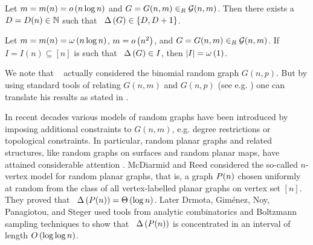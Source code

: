\begin{thm}\label{MDthm:max_degree_ergraph}
Let $m=m(n)=o\left(n\log n\right)$ and $G=G(n,m)\in_R \mathcal G(n,m)$. Then there exists a $D=D(n)\in \mathbb{N}$ such that \whp\ $\Delta\left(G\right)\in\left\{D, D+1\right\}$.
\end{thm}

\begin{thm}\label{MDthm:max_degree_ergraph2}
	Let $m=m(n)=\omega\left(n\log n\right)$, $m=o\left(n^2\right)$, and $G=G(n,m)\in_R \mathcal G(n,m)$. If $I=I(n)\subseteq[n]$ is such that \whp\ $\Delta\left(G\right)\in I$, then $\left|I\right|=\omega\left(1\right)$.
\end{thm}

We note that \Bollobas\ \cite{Bollobas1982} actually considered the binomial random graph $G(n,p)$. But by using standard tools of relating $G(n,m)$ and $G(n,p)$ (see e.g. \cite[Section 1.1]{FriezeKaronski2016}) one can translate his results as stated in .

In recent decades various models of random graphs have been introduced by imposing additional constraints to $G(n,m)$, e.g. degree restrictions or topological constraints. In particular, random planar graphs and related structures, like random graphs on surfaces and random planar maps, have attained considerable attention \cite{ChapuyFusyGimenezMoharNoy2011,DowdenKangSpruessel2018,KangMosshammerSpruessel2020,McDiarmid2008,ChapuyFusyGimenezNoy2015,GimenezNoy2009,KangLuczak2012,McDiarmidStegerWelsh2005,McDiarmidReed2008,DrmotaGimenezNoyPanagiotouSteger2014,ColletDrmotaKlausner2019,DrmotaStufler2020,DrmotaNoyStufler2020,DrmotaGimenezNoy2011,Fusy2009,NoyRequileRue2020,PanagiotouSteger2011,FountoulakisPanagioutou2011,PanagiotouSteger2010,GerkeMcDiarmidStegerWeissl2005,GerkeMcDiarmid2004,GerkeSchlatterStegerTaraz2008,GerkeMcDiarmidStegerWeissl2007}. McDiarmid and Reed \cite{McDiarmidReed2008} considered the so-called $n$-vertex model for random planar graphs, that is, a graph $P(n)$ chosen uniformly at random from the class of all vertex-labelled planar graphs on vertex set $[n]$. They proved that \whp\ $\Delta\left(P(n)\right)=\Theta\left(\log n\right)$. Later Drmota, Giménez, Noy, Panagiotou, and Steger \cite{DrmotaGimenezNoyPanagiotouSteger2014} used tools from analytic combinatorics and Boltzmann sampling techniques to show that \whp\ $\Delta\left(P(n)\right)$ is concentrated in an interval of length $O\left(\log\log n\right)$. 

